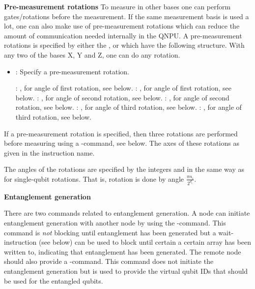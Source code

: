 \textbf{Pre-measurement rotations}
To measure in other bases one can perform gates/rotations before the measurement.
If the same measurement basis is used a lot, one can also make use of pre-measurement rotations which can reduce the amount of communication needed internally in the \ac{QNPU}.
A pre-measurement rotations is specified by either the ,  or  which have the following structure.
With any two of the bases X, Y and Z, one can do any rotation.
\begin{itemize}
  \item {}: Specify a pre-measurement rotation.

        : , for angle of first rotation, see below.
        : , for angle of first rotation, see below.
        : , for angle of second rotation, see below.
        : , for angle of second rotation, see below.
        : , for angle of third rotation, see below.
        : , for angle of third rotation, see below.
\end{itemize}
If a pre-measurement rotation is specified, then three rotations are performed before measuring using a -command, see below.
The axes of these rotations as given in the instruction name.

The angles of the rotations are specified by the integers  and  in the same way as for single-qubit rotations.
That is, rotation  is done by angle $\frac{\pi n_i}{2^{d_i}}$.

\textbf{Entanglement generation}

There are two commands related to entanglement generation.
A node can initiate entanglement generation with another node by using the -command.
This command is \emph{not} blocking until entanglement has been generated but a wait-instruction (see below) can be used to block until certain a certain array has been written to, indicating that entanglement has been generated.
The remote node should also provide a -command.
This command does not initiate the entanglement generation but is used to provide the virtual qubit IDs that should be used for the entangled qubits.

